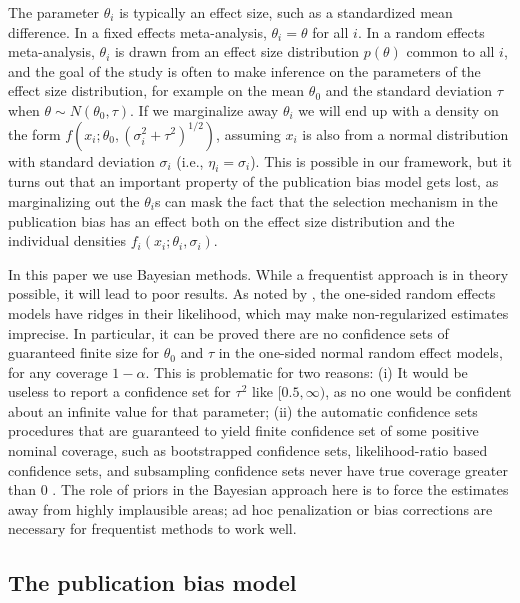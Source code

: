 \documentclass[useAMS,usenatbib,referee]{biom}
\renewcommand{\sqrt}[1]{(#1)^{1/2}}
\begin{document}
The parameter $\theta_{i}$ is typically an effect size, such as a standardized mean difference. In a fixed effects meta-analysis, $\theta_{i}=\theta$ for all $i$. In a random effects meta-analysis, $\theta_{i}$ is drawn from an effect size distribution $p(\theta)$ common to all $i$, and the goal of the study is often to make inference on the parameters of the effect size distribution, for example on the mean $\theta_{0}$ and the standard deviation $\tau$ when $\theta \sim N(\theta_{0},\tau)$. If we marginalize away $\theta_{i}$ we will end up with a density on the form $f(x_{i}; \theta_{0},\sqrt{\sigma_{i}^{2}+\tau^{2}})$, assuming $x_{i}$ is also from a normal distribution with standard deviation $\sigma_{i}$ (i.e., $\eta_i = \sigma_i$). This is possible in our framework, but it turns out that an important property of the publication bias model gets lost, as marginalizing out the $\theta_{i}$s can mask the fact that the selection mechanism in the publication bias has an effect both on the effect size distribution and the individual densities $f_{i}(x_{i};\theta_i, \sigma_i)$.

In this paper we use Bayesian methods. While a frequentist approach is in theory possible, it will lead to poor results. As noted by \citet[Appendix, 1]{mcshane2016adjusting}, the one-sided random effects models have ridges in their likelihood, which may make non-regularized estimates imprecise. In particular, it can be proved \citep{Moss2019} there are no confidence sets of guaranteed finite size for $\theta_{0}$ and $\tau$ in the one-sided normal random effect models, for any coverage $1-\alpha$. This is problematic for two reasons: (i) It would be useless to report a confidence set for $\tau^{2}$ like $[0.5,\infty)$, as no one would be confident about an infinite value for that parameter; (ii) the automatic confidence sets procedures that are guaranteed to yield finite confidence set of some positive nominal coverage, such as bootstrapped confidence sets, likelihood-ratio based confidence sets, and subsampling confidence sets never have true coverage greater than $0$ \citep[see][]{gleser996bootstrap, Moss2019}. The role of priors in the Bayesian approach here is to force the estimates away from highly implausible areas; ad hoc penalization or bias corrections are necessary for frequentist methods to work well.

\subsection{The publication bias model} \label{subsect:publicationBias}
\end{document}
